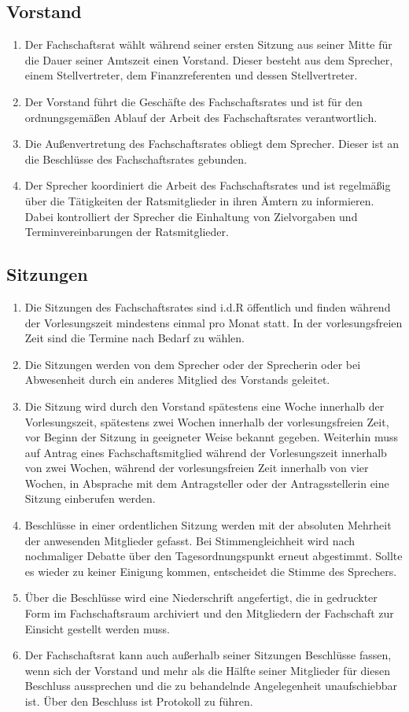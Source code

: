 \subsection{Vorstand}
\begin{enumerate}
	\item Der Fachschaftsrat wählt während seiner ersten Sitzung aus seiner Mitte für die Dauer seiner Amtszeit einen Vorstand. Dieser besteht aus dem Sprecher, einem Stellvertreter, dem Finanzreferenten und dessen Stellvertreter.
	\item Der Vorstand führt die Geschäfte des Fachschaftsrates und ist für den ordnungsgemäßen Ablauf der Arbeit des Fachschaftsrates verantwortlich.
	\item Die Außenvertretung des Fachschaftsrates obliegt dem Sprecher. Dieser ist an die Beschlüsse des Fachschaftsrates gebunden.
	\item Der Sprecher koordiniert die Arbeit des Fachschaftsrates und ist regelmäßig über die Tätigkeiten der Ratsmitglieder in ihren Ämtern zu informieren. Dabei kontrolliert der Sprecher die Einhaltung von Zielvorgaben und Terminvereinbarungen der Ratsmitglieder.
\end{enumerate}

\subsection{Sitzungen}
\begin{enumerate}
	\item Die Sitzungen des Fachschaftsrates sind i.d.R öffentlich und finden während der Vorlesungszeit mindestens einmal pro Monat statt. In der vorlesungsfreien Zeit sind die Termine nach Bedarf zu wählen.
	\item Die Sitzungen werden von dem Sprecher oder der Sprecherin oder bei Abwesenheit durch ein anderes Mitglied des Vorstands geleitet.
	\item Die Sitzung wird durch den Vorstand spätestens eine Woche innerhalb der Vorlesungszeit, spätestens zwei Wochen innerhalb der vorlesungsfreien Zeit, vor Beginn der Sitzung in geeigneter Weise bekannt gegeben. Weiterhin muss auf Antrag eines Fachschaftsmitglied während der Vorlesungszeit innerhalb von zwei Wochen, während der vorlesungsfreien Zeit innerhalb von vier Wochen, in Absprache mit dem Antragsteller oder der Antragsstellerin eine Sitzung einberufen werden.
	\item Beschlüsse in einer ordentlichen Sitzung werden mit der absoluten Mehrheit der anwesenden Mitglieder gefasst. Bei Stimmengleichheit wird nach nochmaliger Debatte über den Tagesordnungspunkt erneut abgestimmt. Sollte es wieder zu keiner Einigung kommen, entscheidet die Stimme des Sprechers.
	\item Über die Beschlüsse wird eine Niederschrift angefertigt, die in gedruckter Form im Fachschaftsraum archiviert und den Mitgliedern der Fachschaft zur Einsicht gestellt werden muss.
	\item Der Fachschaftsrat kann auch außerhalb seiner Sitzungen Beschlüsse fassen, wenn sich der Vorstand und mehr als die Hälfte seiner Mitglieder für diesen Beschluss aussprechen und die zu behandelnde Angelegenheit unaufschiebbar ist. Über den Beschluss ist Protokoll zu führen.
\end{enumerate}
